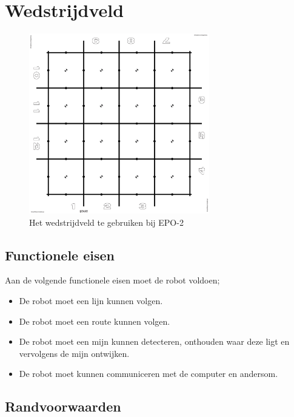 \documentclass{report}
\begin{document}
\section{Wedstrijdveld}
\label{sec:field}

\begin{figure}[H]
	\centering
	\includegraphics[width=0.7\textwidth]{competitionField2440x2440-rc.pdf}
	\caption{Het wedstrijdveld te gebruiken bij EPO-2}
	\label{fig:field}
\end{figure}


\subsection{Functionele eisen}

Aan de volgende functionele eisen moet de robot voldoen;

\begin{itemize}

\item
De robot moet een lijn kunnen volgen.


\item 
De robot moet een route kunnen volgen.

\item
De robot moet een mijn kunnen detecteren, onthouden waar deze ligt en vervolgens de mijn ontwijken.

\item 
De robot moet kunnen communiceren met de computer en andersom.

\end{itemize}


\subsection{Randvoorwaarden}
\end{document}
